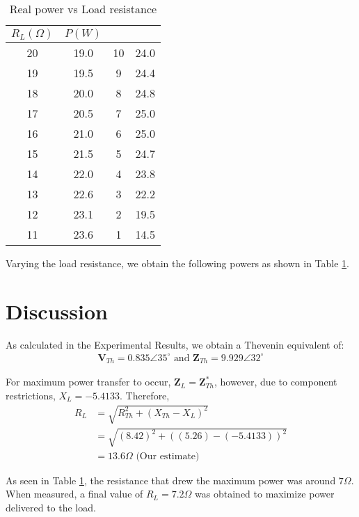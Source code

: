 \documentclass[12pt]{article}
\begin{document}
\begin{table}[h!]
    \centering
    \begin{tabular}{c|c||c|c}
    \(R_L (\Omega)\) & \(P (W)\) & & \\ \hline
    20           & 19.0 & 10 & 24.0 \\
    19           & 19.5 & 9 & 24.4 \\
    18           & 20.0 & 8 & 24.8 \\
    17           & 20.5 & 7 & 25.0 \\
    16           & 21.0 & 6 & 25.0 \\
    15           & 21.5 & 5 & 24.7 \\
    14           & 22.0 & 4 & 23.8 \\
    13           & 22.6 & 3 & 22.2 \\
    12           & 23.1 & 2 & 19.5 \\
    11           & 23.6 & 1 & 14.5 \\
    \end{tabular}
    \caption{Real power vs Load resistance}
    \label{table:1}
\end{table}

Varying the load resistance, we obtain the following powers as shown in Table \ref{table:1}.

\section{Discussion}
As calculated in the Experimental Results, we obtain a Thevenin equivalent of:
\begin{align*}
    \bm{V}_{Th} = 0.835\angle 35^\circ \text{ and } \bm{Z}_{Th} = 9.929\angle 32^\circ
\end{align*}

For maximum power transfer to occur, \(\bm{Z}_{L} = \bm{Z}_{Th}^*\), however, due to component restrictions, \(X_L = -5.4133\).
Therefore, 
\begin{align*}
    R_L &= \sqrt{R_{Th}^2 + \left(X_{Th} - X_L\right)^2} \\
        &= \sqrt{(8.42)^2 + \left((5.26) - (-5.4133)\right)^2} \\
        &= 13.6\Omega \text{ (Our estimate)}
\end{align*}

As seen in Table \ref{table:1}, the resistance that drew the maximum power was around \(7\Omega\).
When measured, a final value of \(R_L = 7.2\Omega\) was obtained to maximize power delivered to the load.
\end{document}
